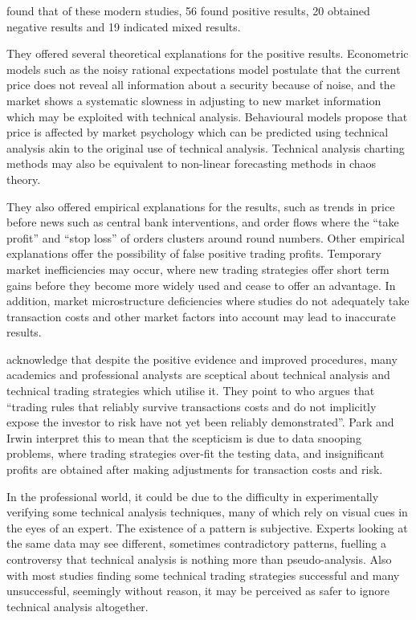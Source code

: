 \documentclass[12pt, oneside, a4paper]{article}
\theoremstyle{definition}
\begin{document}
\cite{taprofitability} found that of these modern studies, 56 found positive results, 20 obtained negative results and 19 indicated mixed results. 

They offered several theoretical explanations for the positive results. Econometric models such as the noisy rational expectations model postulate that the current price does not reveal all information about a security because of noise, and the market shows a systematic slowness in adjusting to new market information which may be exploited with technical analysis. Behavioural models propose that price is affected by market psychology which can be predicted using technical analysis akin to the original use of technical analysis. Technical analysis charting methods may also be equivalent to non-linear forecasting methods in chaos theory.

They also offered empirical explanations for the results, such as trends in price before news such as central bank interventions, and order flows where the ``take profit'' and ``stop loss'' of orders clusters around round numbers. Other empirical explanations offer the possibility of false positive trading profits. Temporary market inefficiencies may occur, where new trading strategies offer short term gains before they become more widely used and cease to offer an advantage. In addition, market microstructure deficiencies where studies do not adequately take transaction costs and other market factors into account may lead to inaccurate results. 

\cite{taprofitability} acknowledge that despite the positive evidence and improved procedures, many academics and professional analysts are sceptical about technical analysis and technical trading strategies which utilise it. They point to \citet[p.~25]{assetpricing} who argues that ``trading rules that reliably survive transactions costs and do not implicitly expose the investor to risk have not yet been reliably demonstrated''. Park and Irwin interpret this to mean that the scepticism is due to data snooping problems, where trading strategies over-fit the testing data, and insignificant profits are obtained after making adjustments for transaction costs and risk.

In the professional world, it could be due to the difficulty in experimentally verifying some technical analysis techniques, many of which rely on visual cues in the eyes of an expert. The existence of a pattern is subjective. Experts looking at the same data may see different, sometimes contradictory patterns, fuelling a controversy that technical analysis is nothing more than pseudo-analysis. Also with most studies finding some technical trading strategies successful and many unsuccessful, seemingly without reason, it may be perceived as safer to ignore technical analysis altogether.
\end{document}
